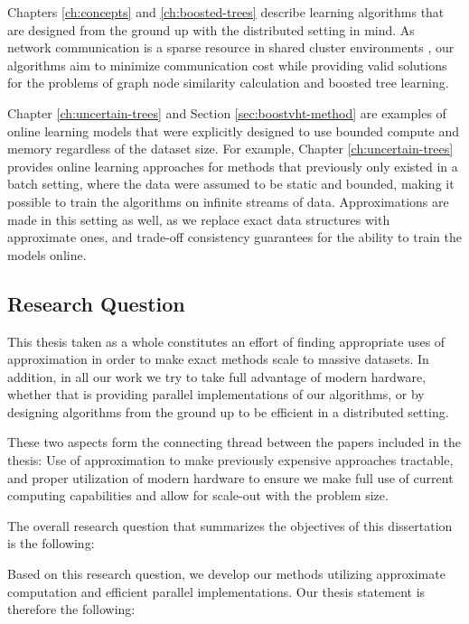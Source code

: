 Chapters \ref{ch:concepts} and \ref{ch:boosted-trees} describe learning algorithms that
are designed from the ground up with the distributed setting in mind. As network
communication is a sparse resource in shared cluster environments \cite{optimization-communication-complexity},
our algorithms aim to minimize communication cost while providing valid
solutions for the problems of graph node similarity calculation and
boosted tree learning.

Chapter \ref{ch:uncertain-trees} and Section \ref{sec:boostvht-method}
are examples of online learning models
that were explicitly designed to use bounded compute and memory regardless of the
dataset size. For example, Chapter \ref{ch:uncertain-trees} provides online learning approaches
for methods that previously only existed in a batch setting, where the data were assumed to be
static and bounded, making it possible to train the algorithms on infinite streams of
data. Approximations are made in this setting as well,
as we replace exact data structures with approximate ones, and trade-off consistency
guarantees for the ability to train the models online.


\subsection{Research Question}

This thesis taken as a whole constitutes an effort of finding appropriate
uses of approximation in order to make exact methods scale to massive datasets.
In addition, in all our work we try to take full advantage of modern hardware,
whether that is providing parallel implementations of our algorithms,
or by designing algorithms from the
ground up to be efficient in a distributed setting.

These two aspects form the connecting thread between the papers
included in the thesis: Use of approximation to make previously expensive approaches tractable, and
proper utilization of modern hardware to ensure we make full use of current
computing capabilities and allow for scale-out with the problem size.

The overall research question that summarizes the objectives of this dissertation is the following:

\begin{displayquote}
	\researchQuestion
\end{displayquote}

\noindent
Based on this research question, we develop our methods utilizing approximate computation and efficient parallel implementations. Our thesis statement is therefore the following:

